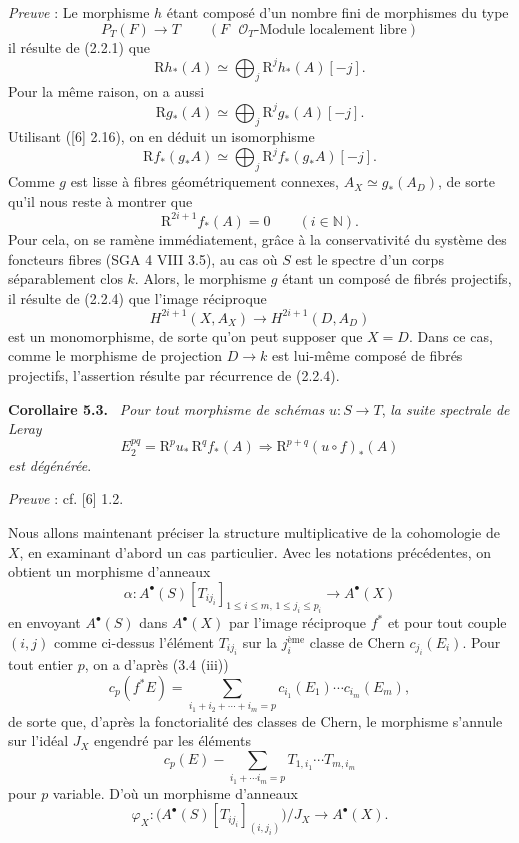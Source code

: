 \documentclass[11pt]{article}
\newenvironment{statement}[1]{\par\medskip\noindent\textbf{#1.}\ }{\par\medskip}
\newcommand{\R}{\mathrm{R}}\newcommand{\RHomCore}{\mathrm{RHom}}
\providecommand{\R}{\mathrm R}
\begin{document}
\emph{Preuve} : Le morphisme $h$ étant composé d'un nombre fini de morphismes du type
\[
P_T(F)\to T\qquad (F\text{ }\mathcal O_T\text{-Module localement libre})
\tag{Q}
\]
il résulte de (2.2.1) que
\[
\R h_*(A)\simeq\bigoplus_j \mathrm{R}^jh_*(A)[-j].
\]
Pour la même raison, on a aussi
\[
\R g_*(A)\simeq\bigoplus_j \mathrm{R}^jg_*(A)[-j].
\]
Utilisant ([6] 2.16), on en déduit un isomorphisme
\[
\R f_*(g_*A)\simeq\bigoplus_j \mathrm{R}^j f_*(g_*A)[-j].
\]
Comme $g$ est lisse à fibres géométriquement connexes, $A_X\simeq g_*(A_D)$, de sorte qu'il nous reste à montrer que
\[
\mathrm{R}^{2i+1}f_*(A)=0\qquad (i\in\mathbb N).
\tag{5.2.1}
\]
Pour cela, on se ramène immédiatement, grâce à la conservativité du système des foncteurs fibres (SGA 4 VIII 3.5), au cas où $S$ est le spectre d'un corps séparablement clos $k$. Alors, le morphisme $g$ étant un composé de fibrés projectifs, il résulte de (2.2.4) que l'image réciproque
\[
H^{2i+1}(X,A_X)\to H^{2i+1}(D,A_D)
\]
est un monomorphisme, de sorte qu'on peut supposer que $X=D$. Dans ce cas, comme le
morphisme de projection $D\to k$ est lui-même composé de fibrés projectifs, l'assertion résulte par récurrence de (2.2.4).

\begin{statement}{Corollaire 5.3}
\emph{Pour tout morphisme de schémas} $u:S\to T$, \emph{la suite spectrale de Leray}
\[
E_2^{pq}=\mathrm{R}^p u_*\,\mathrm{R}^q f_*(A)\Rightarrow \mathrm{R}^{p+q}(u\circ f)_*(A)
\]
\emph{est dégénérée}.
\end{statement}

\emph{Preuve} : cf. [6] 1.2.

Nous allons maintenant préciser la structure multiplicative de la cohomologie de $X$, en examinant d'abord un cas particulier. Avec les notations précédentes, on obtient un morphisme d'anneaux
\[
\alpha:A^{\bullet}(S)[T_{ij_i}]_{1\le i\le m,\,1\le j_i\le p_i}\to A^{\bullet}(X)
\]
en envoyant $A^{\bullet}(S)$ dans $A^{\bullet}(X)$ par l'image réciproque $f^*$ et pour tout couple $(i,j)$ comme ci-dessus l'élément $T_{ij_i}$ sur la $j_i^{\text{ème}}$ classe de Chern $c_{j_i}(E_i)$. Pour tout entier $p$, on a d'après (3.4 (iii))
\[
c_p(f^*E)=\sum_{i_1+i_2+\cdots+i_m=p}c_{i_1}(E_1)\cdots c_{i_m}(E_m),
\]
de sorte que, d'après la fonctorialité des classes de Chern, le morphisme s'annule sur l'idéal $J_X$ engendré par les éléments
\[
c_p(E)-\sum_{i_1+\cdots i_m=p}T_{1,i_1}\cdots T_{m,i_m}
\]
pour $p$ variable. D'où un morphisme d'anneaux
\[
\varphi_X:\bigl(A^{\bullet}(S)[T_{ij_i}]_{(i,j_i)}\bigr)/J_X\to A^{\bullet}(X).
\]
\end{document}
